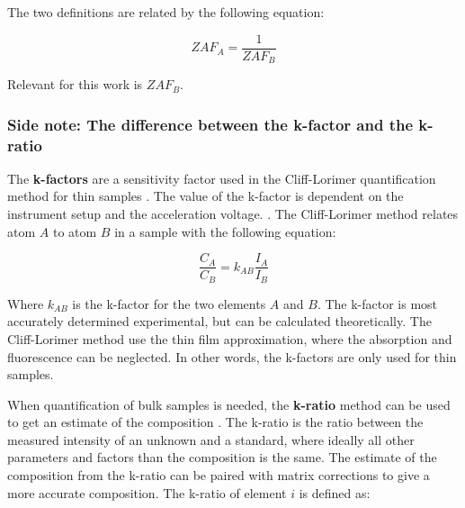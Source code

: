 The two definitions are related by the following equation:

\begin{equation}
    \label{eq:theory:quantitative:zaf_a_b_relation}
    ZAF_A = \frac{1}{ZAF_B}
\end{equation}

Relevant for this work is $ZAF_B$.





\subsubsection*{Side note: The difference between the k-factor and the k-ratio}


The \textbf{k-factors} are a sensitivity factor used in the Cliff-Lorimer quantification method for thin samples \cite{CL1975,williams_carter_tem_2009}.
The value of the k-factor is dependent on the instrument setup and the acceleration voltage.
.
The Cliff-Lorimer method relates atom $A$ to atom $B$ in a sample with the following equation:

\begin{equation}
    \label{eq:theory:quantitative:cliff_lorimer}
    \frac{C_A}{C_B} = k_{AB} \frac{I_A}{I_B}
\end{equation}

Where $k_{AB}$ is the k-factor for the two elements $A$ and $B$.
The k-factor is most accurately determined experimental, but can be calculated theoretically.
The Cliff-Lorimer method use the thin film approximation, where the absorption and fluorescence can be neglected.
In other words, the k-factors are only used for thin samples.


When quantification of bulk samples is needed, the \textbf{k-ratio} method can be used to get an estimate of the composition \cite[Ch. 19.1]{goldstein_scanning_2018}.
The k-ratio is the ratio between the measured intensity of an unknown and a standard, where ideally all other parameters and factors than the composition is the same.
The estimate of the composition from the k-ratio can be paired with matrix corrections to give a more accurate composition.
The k-ratio of element $i$ is defined as:

